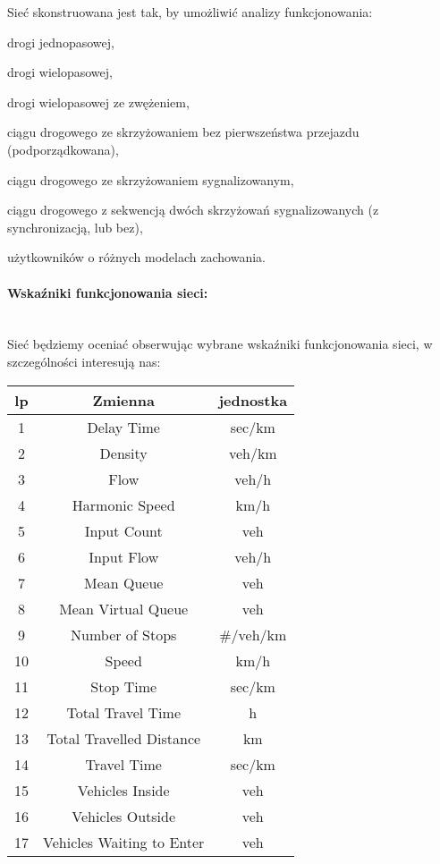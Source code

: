 \documentclass[11pt,a4paper]{article}
\begin{document}
Sieć skonstruowana jest tak, by umożliwić analizy funkcjonowania:

\begin{compactenum}
 \item drogi jednopasowej,
 \item drogi wielopasowej, 
 \item drogi wielopasowej ze zwężeniem, 
 \item ciągu drogowego ze skrzyżowaniem bez pierwszeństwa przejazdu (podporządkowana),
 \item ciągu drogowego ze skrzyżowaniem sygnalizowanym,
 \item ciągu drogowego z sekwencją dwóch skrzyżowań sygnalizowanych (z synchronizacją, lub bez),
 \item użytkowników o różnych modelach zachowania.
 \end{compactenum}
 
 \paragraph*{Wskaźniki funkcjonowania sieci:}
~\\
Sieć będziemy oceniać obserwując wybrane wskaźniki funkcjonowania sieci, w szczególności interesują nas:
\begin{table}[H]
\centering
\label{my-label}
\begin{tabular}{c|c|c}
\textbf{lp} & \textbf{Zmienna}                   & \textbf{jednostka} \\ \hline
1  & Delay Time                & sec/km    \\
2  & Density                   & veh/km    \\
3  & Flow                      & veh/h     \\
4  & Harmonic Speed            & km/h      \\
5  & Input Count               & veh       \\
6  & Input Flow                & veh/h     \\
7  & Mean Queue                & veh       \\
8  & Mean Virtual Queue        & veh       \\
9  & Number of Stops           & \#/veh/km \\
10 & Speed                     & km/h      \\
11 & Stop Time                 & sec/km    \\
12 & Total Travel Time         & h         \\
13 & Total Travelled Distance  & km        \\
14 & Travel Time               & sec/km    \\
15 & Vehicles Inside           & veh       \\
16 & Vehicles Outside          & veh       \\
17 & Vehicles Waiting to Enter & veh    
\end{tabular}
\end{table}
 
\end{document}
